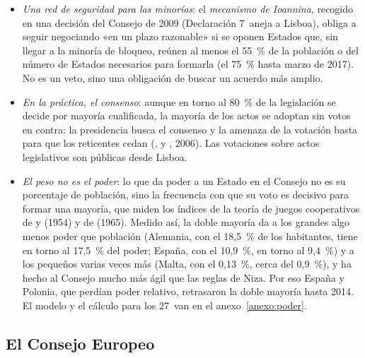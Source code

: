 \documentclass[11pt]{article}
\begin{document}
\begin{itemize}
\begin{itemize}
  \item \emph{Unanimidad} (la abstención no la impide): PESC, fiscalidad, recursos propios y marco financiero, adhesiones, ciudadanía, seguridad social y protección social, cláusula de flexibilidad y parte de la justicia penal.
  \item \emph{Mayoría simple} (14~Estados): cuestiones de procedimiento.
  \end{itemize}
\item \emph{Una red de seguridad para las minorías}: el \emph{mecanismo de Ioannina}, recogido en una decisión del Consejo de 2009 (Declaración 7~aneja a Lisboa), obliga a seguir negociando «en un plazo razonable» si se oponen Estados que, sin llegar a la minoría de bloqueo, reúnen al menos el 55~\% de la población o del número de Estados necesarios para formarla (el 75~\% hasta marzo de 2017). No es un veto, sino una obligación de buscar un acuerdo más amplio.
\item \emph{En la práctica, el consenso}: aunque en torno al 80~\% de la legislación se decide por mayoría cualificada\nocite{Consejo2026Votacion}, la mayoría de los actos se adoptan sin votos en contra: la presidencia busca el consenso y la amenaza de la votación basta para que los reticentes cedan (,  y , 2006)\nocite{HayesRenshaw2006When}. Las votaciones sobre actos legislativos son públicas desde Lisboa.
\item \emph{El peso no es el poder}: lo que da poder a un Estado en el Consejo no es su porcentaje de población, sino la frecuencia con que su voto es decisivo para formar una mayoría, que miden los índices de la teoría de juegos cooperativos de  y  (1954) y de  (1965). Medido así, la doble mayoría da a los grandes algo menos poder que población (Alemania, con el 18,5~\% de los habitantes, tiene en torno al 17,5~\% del poder; España, con el 10,9~\%, en torno al 9,4~\%) y a los pequeños varias veces más (Malta, con el 0,13~\%, cerca del 0,9~\%), y ha hecho al Consejo mucho más ágil que las reglas de Niza. Por eso España y Polonia, que perdían poder relativo, retrasaron la doble mayoría hasta 2014. El modelo y el cálculo para los 27~van en el anexo~\ref{anexo:poder}.
\end{itemize}

\subsection{El Consejo Europeo}\label{sec:consejo-europeo}
\end{document}
